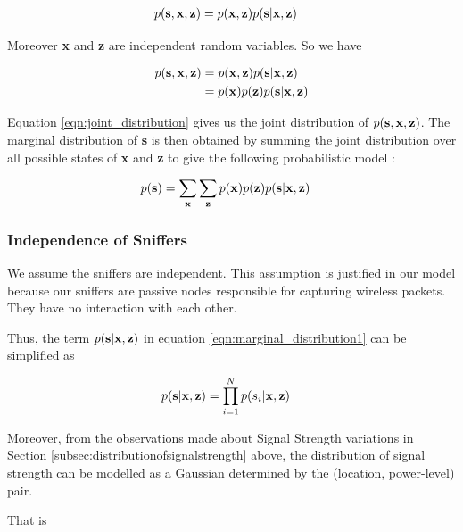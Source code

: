 \documentclass{Localization-PaperWriteupDraft}
\begin{document}
\begin{align}
p( {\bf s}, {\bf x}, {\bf z}) &= p( {\bf x}, {\bf z}) p( {\bf s} | {\bf x}, {\bf z}) 
\end{align}

Moreover {\bf x} and {\bf z} are independent random variables. So we have

\begin{align}
p( {\bf s}, {\bf x}, {\bf z}) &= p( {\bf x}, {\bf z}) p( {\bf s} | {\bf x}, {\bf z}) \nonumber \\
&= p({\bf x})p({\bf z})p( {\bf s} | {\bf x}, {\bf z}) \label{eqn:joint_distribution}
\end{align}

Equation \ref{eqn:joint_distribution} gives us the joint distribution of $ p( {\bf s}, {\bf x}, {\bf z}) $. The marginal distribution of {\bf s} is then obtained by summing the joint distribution over all possible states of {\bf x} and {\bf z} to give the following probabilistic model :

\begin{align}
p( {\bf s}) & = \sum_{\bf x}\sum_{\bf z} p({\bf x})p({\bf z})p({\bf s}|{\bf x}, {\bf z}) \label{eqn:marginal_distribution1}
\end{align}

\subsubsection{Independence of Sniffers}
\label{subsubsec:independenceofsniffers}

We assume the sniffers are independent. This assumption is justified in our model because our sniffers are passive nodes responsible for capturing wireless packets. They have no interaction with each other. 

Thus, the term $p( {\bf s} | {\bf x}, {\bf z})$ in equation
\ref{eqn:marginal_distribution1} can be simplified as

\begin{align}
p( {\bf s} | {\bf x}, {\bf z}) & = \prod_{i=1}^N p({s_{i}}|{\bf x}, {\bf
		z}) \label{eqn:conditional_distribution1}
\end{align}

Moreover, from the observations made about Signal Strength variations in
Section \ref{subsec:distributionofsignalstrength} above, the distribution of signal strength
can be modelled as a Gaussian determined by the (location, power-level) pair. 

That is 
\end{document}
